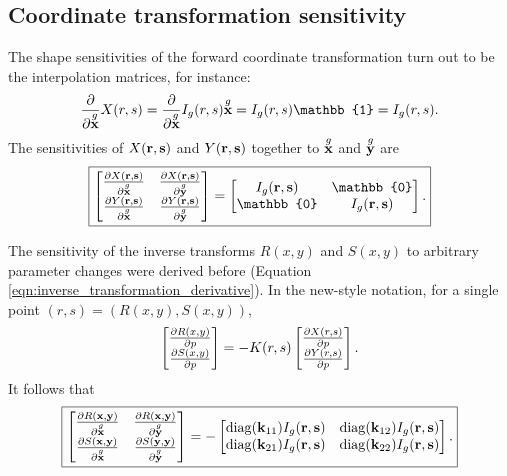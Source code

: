 \subsection{Coordinate transformation sensitivity}
The shape sensitivities of the forward coordinate transformation turn out to be the interpolation matrices, for instance:
%
\begin{equation}
\pp{}{\g{\ve x}}X(r,s) = \pp{}{\g{\ve x}}I_g(r,s) \g{\ve x} = I_g(r,s) \mathbb{1} = I_g(r,s).
\end{equation}
%
The sensitivities of $X(\textbf{r}, \textbf{s})$ and $Y(\textbf{r}, \textbf{s})$ together to $\overset{g}{\textbf{x}}$ and $\overset{g}{\textbf{y}}$ are
%
\begin{equation}
\boxed{
\begin{bmatrix}
\pp{X(\ve r,\ve s)}{\g{\ve x}} & \pp{X(\ve r,\ve s)}{\g{\ve y}} \\
\pp{Y(\ve r,\ve s)}{\g{\ve x}} & \pp{Y(\ve r,\ve s)}{\g{\ve y}}
\end{bmatrix}
=
\begin{bmatrix}
I_g(\ve r,\ve s) & \mathbb{0} \\
\mathbb{0} & I_g(\ve r,\ve s)
\end{bmatrix}.
}%
\end{equation}

The sensitivity of the inverse transforms $R(x,y)$ and $S(x,y)$ to arbitrary parameter changes were derived before (Equation \ref{eqn:inverse_transformation_derivative}).  In the new-style notation, for a single point $(r,s) = (R(x,y), S(x,y))$,
%
\begin{equation}
\begin{bmatrix} \frac{\partial{R(x,y)}}{\partial{p}} \\ \frac{\partial{S(x,y)}}{\partial{p}} \end{bmatrix}
=
-K(r,s)
\begin{bmatrix}
\frac{\partial{X(r,s)}}{\partial{p}} \\ \frac{\partial{Y(r,s)}}{\partial{p}}
\end{bmatrix}.
\end{equation}
%
It follows that
%
\begin{equation}
\label{eqn:rs_sensitivity}
\boxed{
\begin{bmatrix}
\pp{R(\ve x,\ve y)}{\g{\ve x}} & \pp{R(\ve x,\ve y)}{\g{\ve y}} \\
\pp{S(\ve x,\ve y)}{\g{\ve x}} & \pp{S(\ve y,\ve y)}{\g{\ve y}}
\end{bmatrix}
=
-\begin{bmatrix}
\operatorname{diag}(\ve{k}_{11}) I_g(\ve r, \ve s) & \operatorname{diag}(\ve{k}_{12}) I_g(\ve r, \ve s) \\
\operatorname{diag}(\ve{k}_{21}) I_g(\ve r, \ve s) & \operatorname{diag}(\ve{k}_{22}) I_g(\ve r, \ve s)
\end{bmatrix}.
}%
\end{equation}

